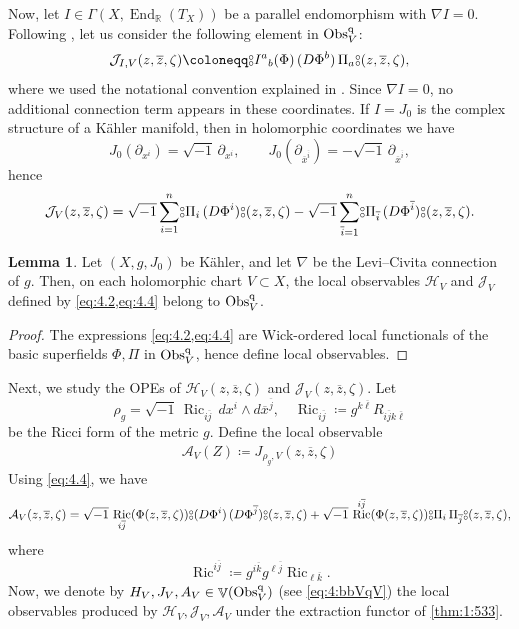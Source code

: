 \documentclass[final,reqno]{amsart}
\numberwithin{equation}{section}
\theoremstyle{definition}
\newtheorem{lem}[thm]{Lemma}
\newcommand{\ol}{\overline}
\newcommand{\ceq}{\coloneqq} %
\newcommand{\bbR}{\mathbb{R}}
\newcommand{\clA}{\mathcal{A}}
\newcommand{\clH}{\mathcal{H}}
\newcommand{\clJ}{\mathcal{J}}
\newcommand{\pd}{\partial}
\newcommand{\qObs}[1]{\mathop{\Obs^{\textup{q}}_{#1}}}
\newcommand{\dbc}{%
 \mathrel{\vcenter{\hbox{\ooalign{%
  \raisebox{0.5ex}{$\scriptstyle \circ$}\cr%
  \raisebox{-0.5ex}{$\scriptstyle \circ$}%
 }}}}%
}
\newcommand{\nod}[1]{\mathopen{\dbc} \mathrel{#1} \mathclose{\dbc}}
\DeclareMathOperator{\bbV}{\mathbb{V}}
\DeclareMathOperator{\End}{End}
\DeclareMathOperator{\Ric}{Ric}
\DeclareMathOperator{\Obs}{Obs}
\begin{document}
Now, let $I\in \Gamma(X,\End_{\bbR}(T_X))$ be 
a parallel endomorphism with $\nabla I=0$. 
Following \cite[Lemma 7.2]{BHS}, 
let us consider the following element in $\qObs{V}$:
\begin{align}\label{eq:4.3}
 \clJ_{I,V}(z,\ol{z},\zeta) \ceq 
  \nod{I^a{}_b(\Phi)\,(D\Phi^b)\,\Pi_a}(z,\ol{z},\zeta),
\end{align}
where we used the notational convention 
explained in \cite[(7.1.1)--(7.1.3)]{BHS}.
Since $\nabla I=0$, no additional connection term appears in these coordinates.
If $I=J_0$ is the complex structure of a K\"ahler manifold, 
then in holomorphic coordinates we have 
\[
 J_0(\pd_{x^i})             =  \sqrt{-1}\,\pd_{x^i},\qquad
 J_0(\pd_{\ol{x}^{\ol{i}}}) = -\sqrt{-1}\,\pd_{\ol{x}^{\ol{i}}},
\]
hence
\begin{align}\label{eq:4.4}
 \clJ_V(z,\ol{z},\zeta) = 
  \sqrt{-1} \sum_{i=1}^n \nod{\Pi_i\,(D\Phi^i)}(z,\ol{z},\zeta) -
  \sqrt{-1} \sum_{\ol{i}=1}^n 
            \nod{\Pi_{\ol{i}}\,(D\Phi^{\ol{i}})}(z,\ol{z},\zeta).
\end{align}

\begin{lem}%
Let $(X,g,J_0)$ be K\"ahler, 
and let $\nabla$ be the Levi--Civita connection of $g$. 
Then, on each holomorphic chart $V \subset X$, the local observables 
$\clH_V$ and $\clJ_V$ defined by \cref{eq:4.2,eq:4.4} belong to $\qObs{V}$. 
\end{lem}

\begin{proof}
The expressions \cref{eq:4.2,eq:4.4} are Wick-ordered local functionals 
of the basic superfields $\Phi,\Pi$ in $\qObs{V}$, 
hence define local observables.
\end{proof}

Next, we study the OPEs of 
$\clH_V(z,\ol{z},\zeta)$ and $\clJ_V(z,\ol{z},\zeta)$. 
Let
\[
 \rho_g = \sqrt{-1}\,\Ric_{i\ol{j}}\,dx^i\wedge d\ol{x}^{\ol{j}}, \quad
 \Ric_{i\ol{j}} \ceq g^{k\ol{\ell}}R_{i\ol{j}k\ol{\ell}}
\]
be the Ricci form of the metric $g$. 
Define the local observable
\begin{align}\label{eq:4:clA}
 \clA_V(Z) \ceq J_{\rho_g,V}(z,\ol{z},\zeta) 
\end{align}
Using \eqref{eq:4.4},  we have 
\[
 \clA_V(z,\ol{z},\zeta) = 
 \sqrt{-1}\,\Ric_{i\ol{j}}(\Phi(z,\ol{z},\zeta)) 
  \nod{(D\Phi^i)\,(D\Phi^{\ol{j}})}(z,\ol{z},\zeta) +
 \sqrt{-1}\,\Ric^{i\ol{j}}(\Phi(z,\ol{z},\zeta)) 
  \nod{\Pi_i\,\Pi_{\ol{j}}}(z,\ol{z},\zeta),
\]
where
\[
 \Ric^{i\ol{j}} \ceq g^{i\ol{k}}g^{\ell\ol{j}}\Ric_{\ell\ol{k}}.
\]
Now, we denote by $H_V,J_V,A_V \in \bbV(\qObs{V})$  (see \eqref{eq:4:bbVqV}) 
the local observables produced by $\clH_V,\clJ_V,\clA_V$ 
under the extraction functor of \cref{thm:1:533}.
\end{document}
